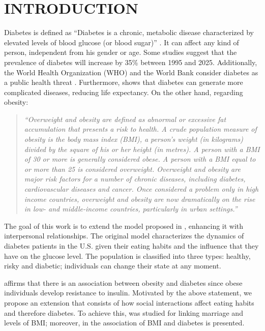 \section{INTRODUCTION}
Diabetes is defined as ``Diabetes is a chronic, metabolic disease characterized by elevated levels of blood glucose (or blood sugar)'' \cite{whodiabetes}. It can affect any kind of person, independent from his gender or age. Some studies suggest that the prevalence of diabetes will increase by 35\% between 1995 and 2025. Additionally, the World Health Organization (WHO) and the World Bank consider diabetes as a public health threat \cite{altamirano2001epidemiology}. Furthermore, \cite{atlas2015international} shows that diabetes can generate more complicated diseases, reducing life expectancy. 
On the other hand,  regarding obesity:

\begin{quote}
\textit{``Overweight and obesity are defined as abnormal or excessive fat accumulation that presents a risk to health. A crude population measure of obesity is the body mass index (BMI), a person’s weight (in kilograms) divided by the square of his or her height (in metres). A person with a BMI of 30 or more is generally considered obese. A person with a BMI equal to or more than 25 is considered overweight.
Overweight and obesity are major risk factors for a number of chronic diseases, including diabetes, cardiovascular diseases and cancer. Once considered a problem only in high income countries, overweight and obesity are now dramatically on the rise in low- and middle-income countries, particularly in urban settings.''}\cite{whoobesity}
\end{quote}

The goal of this work is to extend the model proposed in \cite{netlogomodel}, enhancing it with interpersonal relationships. The original model characterizes the dynamics of diabetes patients in the U.S. given their eating habits and the influence that they have on the glucose level. The population is classified into three types: healthy, risky and diabetic; individuals can change their state at any moment.

\cite{JCI10842} affirms that there is an association between obesity and diabetes since obese individuals develop resistance to insulin. Motivated by the above statement,  we propose an extension that consists of how social interactions affect eating habits and therefore diabetes.  To achieve this, \cite{jeffery2002cross} was studied for linking marriage and levels of BMI; moreover, in \cite{bays2007relationship} the association of BMI and diabetes is presented. 